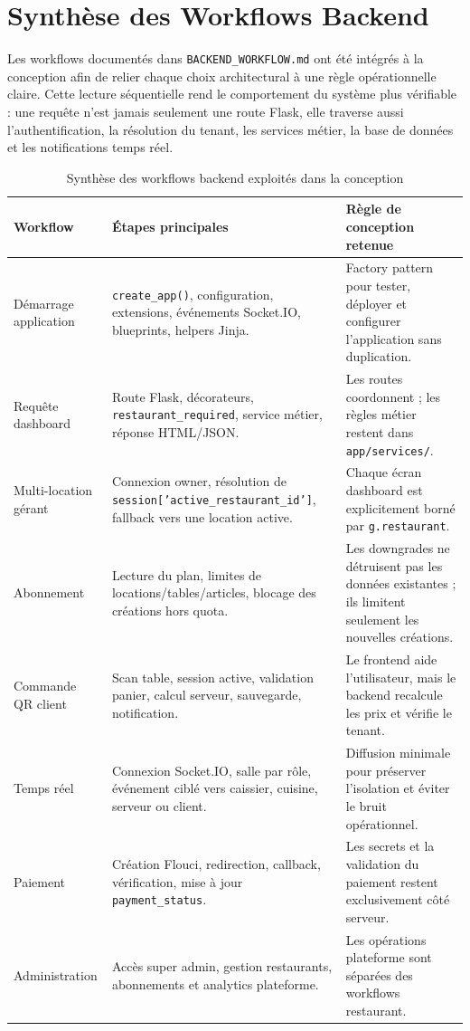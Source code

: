 \documentclass[12pt,a4paper]{report}
\newcommand{\resourcepath}[1]{\texttt{\footnotesize #1}}
\begin{document}
\section{Synthèse des Workflows Backend}

Les workflows documentés dans \resourcepath{BACKEND\_WORKFLOW.md} ont été intégrés à la conception afin de relier chaque choix architectural à une règle opérationnelle claire. Cette lecture séquentielle rend le comportement du système plus vérifiable : une requête n'est jamais seulement une route Flask, elle traverse aussi l'authentification, la résolution du tenant, les services métier, la base de données et les notifications temps réel.

\begin{table}[H]
    \centering
    \begin{tabularx}{\textwidth}{>{\RaggedRight\arraybackslash}p{3.7cm} X X}
        \toprule
        \rowcolor{secondary!10}
        \textbf{Workflow} & \textbf{Étapes principales} & \textbf{Règle de conception retenue} \\
        \midrule
        Démarrage application & \texttt{create\_app()}, configuration, extensions, événements Socket.IO, blueprints, helpers Jinja. & Factory pattern pour tester, déployer et configurer l'application sans duplication. \\
        Requête dashboard & Route Flask, décorateurs, \texttt{restaurant\_required}, service métier, réponse HTML/JSON. & Les routes coordonnent ; les règles métier restent dans \texttt{app/services/}. \\
        Multi-location gérant & Connexion owner, résolution de \texttt{session['active\_restaurant\_id']}, fallback vers une location active. & Chaque écran dashboard est explicitement borné par \texttt{g.restaurant}. \\
        Abonnement & Lecture du plan, limites de locations/tables/articles, blocage des créations hors quota. & Les downgrades ne détruisent pas les données existantes ; ils limitent seulement les nouvelles créations. \\
        Commande QR client & Scan table, session active, validation panier, calcul serveur, sauvegarde, notification. & Le frontend aide l'utilisateur, mais le backend recalcule les prix et vérifie le tenant. \\
        Temps réel & Connexion Socket.IO, salle par rôle, événement ciblé vers caissier, cuisine, serveur ou client. & Diffusion minimale pour préserver l'isolation et éviter le bruit opérationnel. \\
        Paiement & Création Flouci, redirection, callback, vérification, mise à jour \texttt{payment\_status}. & Les secrets et la validation du paiement restent exclusivement côté serveur. \\
        Administration & Accès super admin, gestion restaurants, abonnements et analytics plateforme. & Les opérations plateforme sont séparées des workflows restaurant. \\
        \bottomrule
    \end{tabularx}
    \caption{Synthèse des workflows backend exploités dans la conception}
    \label{tab:backend-workflows}
\end{table}
\end{document}
